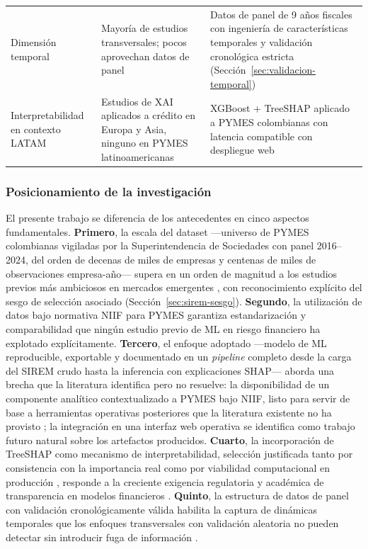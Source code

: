 \documentclass[12pt, letterpaper]{article}
\begin{document}
\begin{table}[htbp]
\begin{tabularx}{\textwidth}{L{3cm} L{5.5cm} L{5.5cm}}
\addlinespace
Dimensi\'on temporal & Mayor\'ia de estudios transversales; pocos aprovechan datos de panel \citep{Bortolotti2024, Mahesh2025} & Datos de panel de 9 a\~nos fiscales con ingenier\'ia de caracter\'isticas temporales y validaci\'on cronol\'ogica estricta (Secci\'on~\ref{sec:validacion-temporal}) \\
\addlinespace
Interpretabilidad en contexto LATAM & Estudios de XAI aplicados a cr\'edito en Europa \citep{Bussmann2020} y Asia, ninguno en PYMES latinoamericanas & XGBoost + TreeSHAP aplicado a PYMES colombianas con latencia compatible con despliegue web \\
\bottomrule
\end{tabularx}
\end{table}

\subsubsection{Posicionamiento de la investigaci\'on}

El presente trabajo se diferencia de los antecedentes en cinco aspectos fundamentales. \textbf{Primero}, la escala del dataset ---universo de PYMES colombianas vigiladas por la Superintendencia de Sociedades con panel 2016--2024, del orden de decenas de miles de empresas y centenas de miles de observaciones empresa-a\~no--- supera en un orden de magnitud a los estudios previos m\'as ambiciosos en mercados emergentes \citep{Mahesh2025}, con reconocimiento expl\'icito del sesgo de selecci\'on asociado (Secci\'on~\ref{sec:sirem-sesgo}). \textbf{Segundo}, la utilizaci\'on de datos bajo normativa NIIF para PYMES garantiza estandarizaci\'on y comparabilidad que ning\'un estudio previo de ML en riesgo financiero ha explotado expl\'icitamente. \textbf{Tercero}, el enfoque adoptado ---modelo de ML reproducible, exportable y documentado en un \textit{pipeline} completo desde la carga del SIREM crudo hasta la inferencia con explicaciones SHAP--- aborda una brecha que la literatura identifica pero no resuelve: la disponibilidad de un componente anal\'itico contextualizado a PYMES bajo NIIF, listo para servir de base a herramientas operativas posteriores que la literatura existente no ha provisto \citep{MayorgaLira2023, BaumontDeOliveira2021, Ioannou2022}; la integraci\'on en una interfaz web operativa se identifica como trabajo futuro natural sobre los artefactos producidos. \textbf{Cuarto}, la incorporaci\'on de TreeSHAP como mecanismo de interpretabilidad, selecci\'on justificada tanto por consistencia con la importancia real \citep{Pathi2025} como por viabilidad computacional en producci\'on \citep{LundbergTreeSHAP2020, Deng2024}, responde a la creciente exigencia regulatoria y acad\'emica de transparencia en modelos financieros \citep{Bussmann2020, Bazarbash2019}. \textbf{Quinto}, la estructura de datos de panel con validaci\'on cronol\'ogicamente v\'alida habilita la captura de din\'amicas temporales que los enfoques transversales con validaci\'on aleatoria no pueden detectar sin introducir fuga de informaci\'on \citep{Zhou2022, Otsuki2022, Bortolotti2024}.
\end{document}
